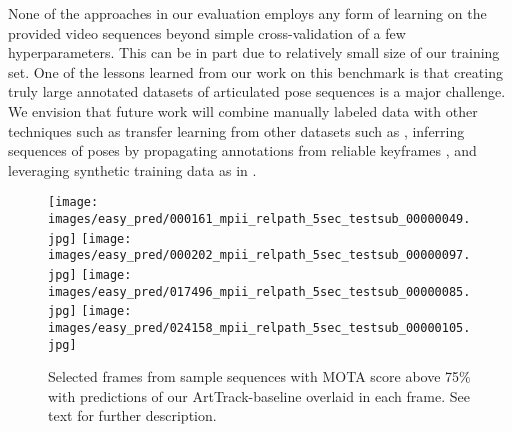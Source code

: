\documentclass[10pt,twocolumn,letterpaper]{article}
\begin{document}
None of the approaches in our evaluation employs any form of learning
on the provided video sequences beyond simple cross-validation of a few hyperparameters.
 This can be in part due to relatively small
size of our training set. One of the lessons learned from our work on this benchmark
is that creating truly large annotated datasets of articulated pose sequences is
a major challenge. We envision that future work will combine manually labeled
data with other techniques such as transfer learning from other datasets such as
 \cite{Carreira_2017_CVPR}, inferring sequences of poses by propagating
annotations from reliable keyframes \cite{Charles16},
and leveraging synthetic training data as in \cite{varol17b}.

\begin{figure*}[t]
	\centering
\texttt{[image: images/easy\_pred/000161\_mpii\_relpath\_5sec\_testsub\_00000049.jpg]} 
	\hfill
	\texttt{[image: images/easy\_pred/000202\_mpii\_relpath\_5sec\_testsub\_00000097.jpg]} 
	\hfill
	\texttt{[image: images/easy\_pred/017496\_mpii\_relpath\_5sec\_testsub\_00000085.jpg]} 
	\hfill
	\texttt{[image: images/easy\_pred/024158\_mpii\_relpath\_5sec\_testsub\_00000105.jpg]} \\
	\vspace{-2mm}
	\caption{Selected frames from sample sequences with MOTA
          score above 75\% with predictions of our ArtTrack-baseline
          overlaid in each frame. See text for further description.}
\label{fig:easy_sequences}
\end{figure*}
\end{document}

